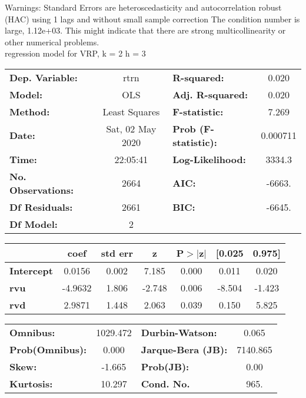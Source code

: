 Warnings: \newline
 [1] Standard Errors are heteroscedasticity and autocorrelation robust (HAC) using 1 lags and without small sample correction \newline
 [2] The condition number is large, 1.12e+03. This might indicate that there are \newline
 strong multicollinearity or other numerical problems.\\ 

regression model for VRP, k = 2 h = 3\begin{center}
\begin{tabular}{lclc}
\toprule
\textbf{Dep. Variable:}    &       rtrn       & \textbf{  R-squared:         } &     0.020   \\
\textbf{Model:}            &       OLS        & \textbf{  Adj. R-squared:    } &     0.020   \\
\textbf{Method:}           &  Least Squares   & \textbf{  F-statistic:       } &     7.269   \\
\textbf{Date:}             & Sat, 02 May 2020 & \textbf{  Prob (F-statistic):} &  0.000711   \\
\textbf{Time:}             &     22:05:41     & \textbf{  Log-Likelihood:    } &    3334.3   \\
\textbf{No. Observations:} &        2664      & \textbf{  AIC:               } &    -6663.   \\
\textbf{Df Residuals:}     &        2661      & \textbf{  BIC:               } &    -6645.   \\
\textbf{Df Model:}         &           2      & \textbf{                     } &             \\
\bottomrule
\end{tabular}
\begin{tabular}{lcccccc}
                   & \textbf{coef} & \textbf{std err} & \textbf{z} & \textbf{P$> |$z$|$} & \textbf{[0.025} & \textbf{0.975]}  \\
\midrule
\textbf{Intercept} &       0.0156  &        0.002     &     7.185  &         0.000        &        0.011    &        0.020     \\
\textbf{rvu}       &      -4.9632  &        1.806     &    -2.748  &         0.006        &       -8.504    &       -1.423     \\
\textbf{rvd}       &       2.9871  &        1.448     &     2.063  &         0.039        &        0.150    &        5.825     \\
\bottomrule
\end{tabular}
\begin{tabular}{lclc}
\textbf{Omnibus:}       & 1029.472 & \textbf{  Durbin-Watson:     } &    0.065  \\
\textbf{Prob(Omnibus):} &   0.000  & \textbf{  Jarque-Bera (JB):  } & 7140.865  \\
\textbf{Skew:}          &  -1.665  & \textbf{  Prob(JB):          } &     0.00  \\
\textbf{Kurtosis:}      &  10.297  & \textbf{  Cond. No.          } &     965.  \\
\bottomrule
\end{tabular}
\end{center}

